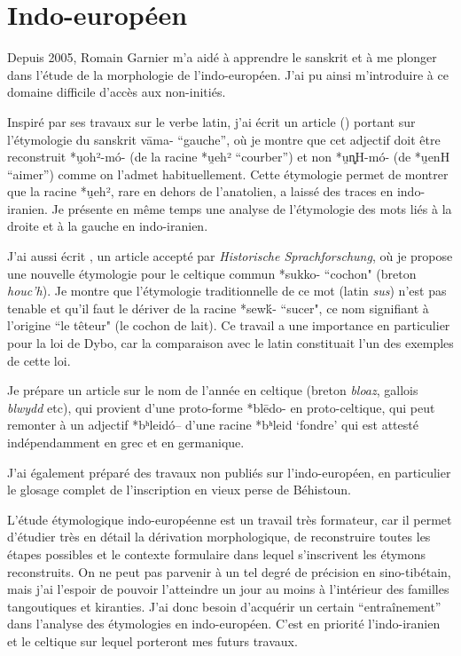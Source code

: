 \documentclass[oldfontcommands,oneside,a4paper,11pt]{memoir}
\newcommand{\ipa}[1]{{\phon #1}} %
\begin{document}
\section{Indo-européen}
Depuis 2005, Romain Garnier m'a aidé à apprendre le sanskrit et à me plonger dans l'étude de la morphologie de l'indo-européen. J'ai pu ainsi m'introduire à ce domaine difficile d'accès aux non-initiés.

Inspiré par ses travaux  sur le verbe latin, j'ai écrit un article (\citealt{jacques13vama}) portant sur l'étymologie du sanskrit \ipa{vāma-} ``gauche'', où je montre que cet adjectif doit être reconstruit *u̯oh²-mó- (de la racine *u̯eh² ``courber'') et non *u̯n̻H-mó- (de *u̯enH ``aimer'') comme on l'admet habituellement. Cette étymologie permet de montrer que la racine *u̯eh², rare en dehors de l'anatolien, a laissé des traces en indo-iranien. Je présente en même temps une analyse de l'étymologie des mots liés à la droite et à la gauche en indo-iranien. 

J'ai aussi écrit \citet{jacques14cochon}, un article accepté par \textit{Historische Sprachforschung}, où je propose une nouvelle étymologie pour le celtique commun *sukko- ``cochon" (breton \textit{houc'h}). Je montre que l'étymologie traditionnelle de ce mot (latin \textit{sus}) n'est pas tenable et qu'il faut le dériver de la racine *sewḱ- ``sucer", ce nom signifiant à l'origine ``le têteur" (le cochon de lait). Ce travail a une importance en particulier pour la loi de Dybo, car la comparaison avec le latin constituait l'un des exemples de cette loi.

Je prépare un article sur le nom de l'année en celtique (breton \textit{bloaz}, gallois \textit{blwydd} etc), qui provient d'une proto-forme *blēdo- en proto-celtique, qui peut remonter à un adjectif *bʰleidó-- d'une racine *bʰleid  `fondre' qui est attesté indépendamment en grec et en germanique.

J'ai également préparé des travaux non publiés sur l'indo-européen, en particulier le glosage complet de l'inscription en vieux perse de Béhistoun.

L'étude étymologique indo-européenne est un travail très formateur, car il permet d'étudier très en détail la dérivation morphologique, de reconstruire toutes les étapes possibles et le contexte formulaire dans lequel s'inscrivent les étymons reconstruits. On ne peut pas parvenir à un tel degré de précision en sino-tibétain, mais j'ai l'espoir de pouvoir l'atteindre un jour  au moins à l'intérieur des familles tangoutiques et kiranties. J'ai donc besoin d'acquérir un certain ``entraînement'' dans l'analyse des étymologies en indo-européen. C'est en priorité l'indo-iranien et le celtique sur lequel porteront mes futurs travaux. 
\end{document}
